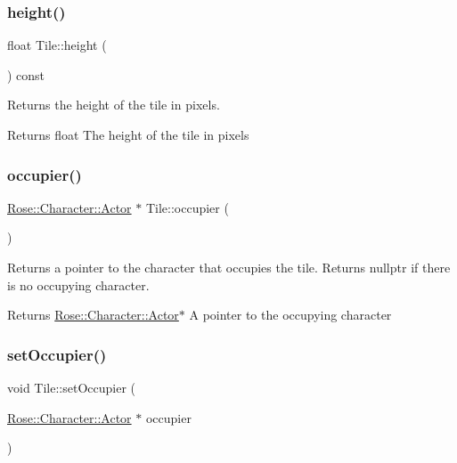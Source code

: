 \subsubsection{\texorpdfstring{height()}{height()}}
{\footnotesize\ttfamily float Tile\+::height (\begin{DoxyParamCaption}{ }\end{DoxyParamCaption}) const}



Returns the height of the tile in pixels. 

\begin{DoxyReturn}{Returns}
float The height of the tile in pixels 
\end{DoxyReturn}
\mbox{\label{classRose_1_1Tile_acce49d5fa69fa6c8945f4b2efe79f718}} 
\subsubsection{\texorpdfstring{occupier()}{occupier()}}
{\footnotesize\ttfamily \mbox{\hyperlink{classRose_1_1Character_1_1Actor}{Rose\+::\+Character\+::\+Actor}} $\ast$ Tile\+::occupier (\begin{DoxyParamCaption}{ }\end{DoxyParamCaption})}



Returns a pointer to the character that occupies the tile. Returns nullptr if there is no occupying character. 

\begin{DoxyReturn}{Returns}
\mbox{\hyperlink{classRose_1_1Character_1_1Actor}{Rose\+::\+Character\+::\+Actor}}$\ast$ A pointer to the occupying character 
\end{DoxyReturn}
\mbox{\label{classRose_1_1Tile_ab82cc04b5c43ad0838b993b90a14fff3}} 
\subsubsection{\texorpdfstring{setOccupier()}{setOccupier()}}
{\footnotesize\ttfamily void Tile\+::set\+Occupier (\begin{DoxyParamCaption}\item[{\mbox{\hyperlink{classRose_1_1Character_1_1Actor}{Rose\+::\+Character\+::\+Actor}} $\ast$}]{occupier }\end{DoxyParamCaption})}



